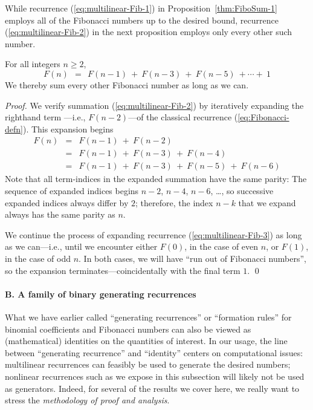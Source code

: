 \medskip

While recurrence (\ref{eq:multilinear-Fib-1}) in Proposition~\ref{thm:FiboSum-1} employs all of the Fibonacci numbers up to the desired bound, recurrence (\ref{eq:multilinear-Fib-2}) in the next proposition employs only every other such number.

\begin{prop}
\label{thm:FiboSum-2}
For all integers $n \geq 2$,
\begin{equation}
\label{eq:multilinear-Fib-2}
F(n) \ \ = \ \
F(n-1) \ + \ F(n-3) \ + \ F(n-5) \ + \cdots + \ 1
\end{equation}
We thereby sum every other Fibonacci number as long as we can.
\end{prop}

\begin{proof}
We verify summation (\ref{eq:multilinear-Fib-2}) by iteratively expanding the righthand term ---i.e., $F(n-2)$---of the classical recurrence (\ref{eq:Fibonacci-defn}).  This expansion begins
\begin{eqnarray}
\label{eq:multilinear-Fib-3}
F(n)
  & = & F(n-1) \ + \ F(n-2) \\
\nonumber
  & = & F(n-1) \ + \ F(n-3) \ + \ F(n-4) \\
\nonumber
  & = & F(n-1) \ + \ F(n-3) \ + \ F(n-5) \ + \ F(n-6)
\end{eqnarray}
Note that all term-indices in the expanded summation have the same parity: The sequence of expanded indices begins $n-2$, $n-4$, $n-6$, \ldots, so successive expanded indices always differ by $2$; therefore, the index $n-k$ that we expand always has the same parity as $n$.

\smallskip

We continue the process of expanding recurrence (\ref{eq:multilinear-Fib-3}) as long as we can---i.e., until we encounter either $F(0)$, in the case of even $n$, or $F(1)$, in the case of odd $n$.  In both cases, we will have ``run out of Fibonacci numbers'', so the expansion terminates---coincidentally with the final term $1$.  \qed
\end{proof}


\paragraph{B. A family of binary generating recurrences}


What we have earlier called ``generating recurrences'' or ``formation rules'' for binomial coefficients and Fibonacci numbers can also be viewed as (mathematical) identities on the quantities of interest.  In our usage, the line between ``generating recurrence'' and ``identity'' centers on computational issues: multilinear recurrences can feasibly be used to generate the desired numbers; nonlinear recurrences such as we expose in this subsection will likely not be used as generators.  Indeed, for several of the results we cover here, we really want to stress the {\em methodology of proof and analysis}.

